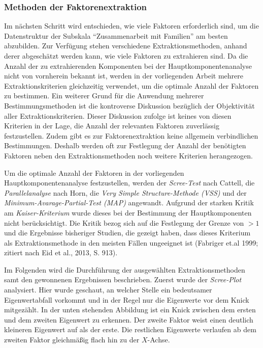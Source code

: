 \documentclass[12pt,a4paper]{article}
\begin{document}
\subsubsection{Methoden der Faktorenextraktion}
Im nächsten Schritt wird entschieden, wie viele Faktoren erforderlich sind, um die Datenstruktur der Subskala "`Zusammenarbeit mit Familien"' am besten abzubilden. Zur Verfügung stehen verschiedene Extraktionsmethoden, anhand derer abgeschätzt werden kann, wie viele Faktoren zu extrahieren sind. Da die Anzahl der zu extrahierenden Komponenten bei der Hauptkomponentenanalyse nicht von vornherein bekannt ist, werden in der vorliegenden Arbeit mehrere Extraktionskriterien gleichzeitig verwendet, um die optimale Anzahl der Faktoren zu bestimmen. Ein weiterer Grund für die Anwendung mehrerer Bestimmungsmethoden ist die kontroverse Diskussion bezüglich der Objektivität aller Extraktionskriterien. Dieser Diskussion zufolge ist keines von diesen Kriterien in der Lage, die Anzahl der relevanten Faktoren zuverlässig festzustellen. Zudem gibt es zur Faktorenextraktion keine allgemein verbindlichen Bestimmungen. Deshalb werden oft zur Festlegung der Anzahl der benötigten Faktoren neben den Extraktionsmethoden noch weitere Kriterien herangezogen.

	Um die optimale Anzahl der Faktoren in der vorliegenden Hauptkomponentenanalyse festzustellen, werden der \textit{Scree-Test} nach Cattell, die \textit{Parallelanalyse} nach Horn, die \textit{Very Simple Structure-Methode (VSS)} und der \textit{Minimum-Avarage-Partial-Test (MAP)} angewandt. Aufgrund der starken Kritik am \textit{Kaiser-Kriterium} wurde dieses bei der Bestimmung der Hauptkomponenten nicht berücksichtigt. Die Kritik bezog sich auf die Festlegung der Grenze von $>1$ und die Ergebnisse bisheriger Studien, die gezeigt haben, dass dieses Kriterium als Extraktionsmethode in den meisten Fällen ungeeignet ist (Fabriger et.al 1999; zitiert nach Eid et al., 2013, S. 913).
	
	Im Folgenden wird die Durchführung der ausgewählten Extraktionsmethoden samt den gewonnenen Ergebnissen beschrieben. Zuerst wurde der \textit{Scree-Plot} analysiert. Hier wurde geschaut, an welcher Stelle ein bedeutsamer Eigenwertabfall vorkommt und in der Regel nur die Eigenwerte vor dem Knick mitgezählt. In der unten stehenden Abbildung ist ein Knick zwischen dem ersten und dem zweiten Eigenwert zu erkennen. Der zweite Faktor weist einen deutlich kleineren Eigenwert auf als der erste. Die restlichen Eigenwerte verlaufen ab dem zweiten Faktor gleichmäßig flach hin zu der $X$-Achse.
	
\end{document}
